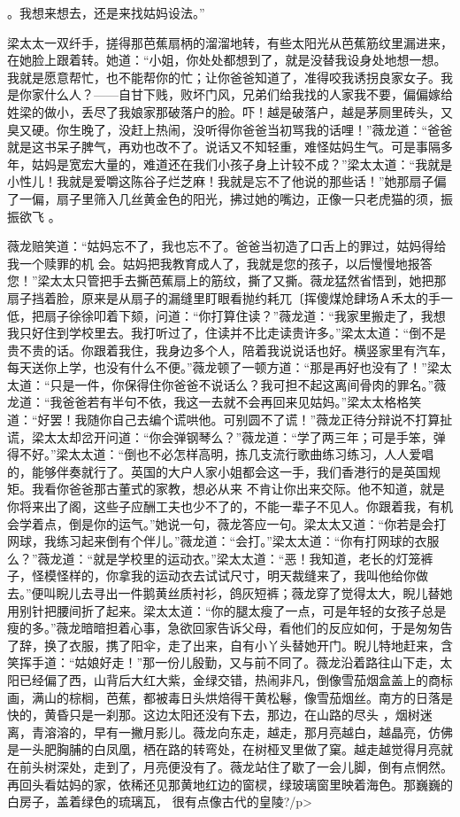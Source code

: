 \documentclass{article}
\begin{document}
\newpage
。我想来想去，还是来找姑妈设法。” 

梁太太一双纤手，搓得那芭蕉扇柄的溜溜地转，有些太阳光从芭蕉筋纹里漏进来，在她脸上跟着转。她道：“小姐，你处处都想到了，就是没替我设身处地想一想。我就是愿意帮忙，也不能帮你的忙；让你爸爸知道了，准得咬我诱拐良家女子。我是你家什么人？——自甘下贱，败坏门风，兄弟们给我找的人家我不要，偏偏嫁给姓梁的做小，丢尽了我娘家那破落户的脸。吓！越是破落户，越是茅厕里砖头，又臭又硬。你生晚了，没赶上热闹，没听得你爸爸当初骂我的话哩！”薇龙道：“爸爸就是这书呆子脾气，再劝也改不了。说话又不知轻重，难怪姑妈生气。可是事隔多年，姑妈是宽宏大量的，难道还在我们小孩子身上计较不成？”梁太太道：“我就是小性儿！我就是爱嚼这陈谷子烂芝麻！我就是忘不了他说的那些话！”她那扇子偏了一偏，扇子里筛入几丝黄金色的阳光，拂过她的嘴边，正像一只老虎猫的须，振振欲飞
。 

薇龙赔笑道：“姑妈忘不了，我也忘不了。爸爸当初造了口舌上的罪过，姑妈得给我一个赎罪的机
\newpage
会。姑妈把我教育成人了，我就是您的孩子，以后慢慢地报答您！”梁太太只管把手去撕芭蕉扇上的筋纹，撕了又撕。薇龙猛然省悟到，她把那扇子挡着脸，原来是从扇子的漏缝里盯眼看抛约耗兀〔挥傻煤炝肆场Ａ禾太的手一低，把扇子徐徐叩着下颏，问道：“你打算住读？”薇龙道：“我家里搬走了，我想我只好住到学校里去。我打听过了，住读并不比走读贵许多。”梁太太道：“倒不是贵不贵的话。你跟着我住，我身边多个人，陪着我说说话也好。横竖家里有汽车，每天送你上学，也没有什么不便。”薇龙顿了一顿方道：“那是再好也没有了！”梁太太道：“只是一件，你保得住你爸爸不说话么？我可担不起这离间骨肉的罪名。”薇龙道：“我爸爸若有半句不依，我这一去就不会再回来见姑妈。”梁太太格格笑道：“好罢！我随你自己去编个谎哄他。可别圆不了谎！”薇龙正待分辩说不打算扯谎，梁太太却岔开问道：“你会弹钢琴么？”薇龙道：“学了两三年；可是手笨，弹得不好。”梁太太道：“倒也不必怎样高明，拣几支流行歌曲练习练习，人人爱唱的，能够伴奏就行了。英国的大户人家小姐都会这一手，我们香港行的是英国规矩。我看你爸爸那古董式的家教，想必从来
\newpage
不肯让你出来交际。他不知道，就是你将来出了阁，这些子应酬工夫也少不了的，不能一辈子不见人。你跟着我，有机会学着点，倒是你的运气。”她说一句，薇龙答应一句。梁太太又道：“你若是会打网球，我练习起来倒有个伴儿。”薇龙道：“会打。”梁太太道：“你有打网球的衣服么？”薇龙道：“就是学校里的运动衣。”梁太太道：“恶！我知道，老长的灯笼裤子，怪模怪样的，你拿我的运动衣去试试尺寸，明天裁缝来了，我叫他给你做去。”便叫睨儿去寻出一件鹅黄丝质衬衫，鸽灰短裤；薇龙穿了觉得太大，睨儿替她用别针把腰间折了起来。梁太太道：“你的腿太瘦了一点，可是年轻的女孩子总是瘦的多。”薇龙暗暗担着心事，急欲回家告诉父母，看他们的反应如何，于是匆匆告了辞，换了衣服，携了阳伞，走了出来，自有小丫头替她开门。睨儿特地赶来，含笑挥手道：“姑娘好走！”那一份儿殷勤，又与前不同了。薇龙沿着路往山下走，太阳已经偏了西，山背后大红大紫，金绿交错，热闹非凡，倒像雪茄烟盒盖上的商标画，满山的棕榈，芭蕉，都被毒日头烘焙得干黄松鬈，像雪茄烟丝。南方的日落是快的，黄昏只是一刹那。这边太阳还没有下去，那边，在山路的尽头
\newpage
，烟树迷离，青溶溶的，早有一撇月影儿。薇龙向东走，越走，那月亮越白，越晶亮，仿佛是一头肥胸脯的白凤凰，栖在路的转弯处，在树桠叉里做了窠。越走越觉得月亮就在前头树深处，走到了，月亮便没有了。薇龙站住了歇了一会儿脚，倒有点惘然。再回头看姑妈的家，依稀还见那黄地红边的窗棂，绿玻璃窗里映着海色。那巍巍的白房子，盖着绿色的琉璃瓦，
很有点像古代的皇陵?/p> 
\end{document}
